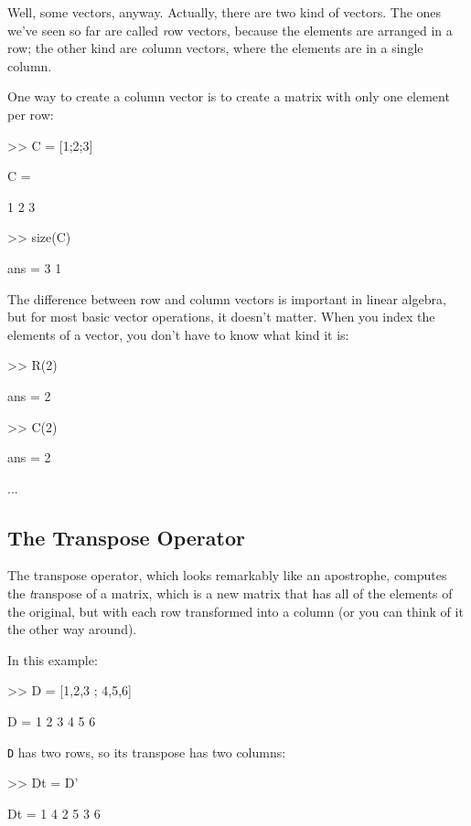 Well, some vectors, anyway.  Actually, there are two kind
of vectors.  The ones we've seen so far are called {\emph row vectors},
because the elements are arranged in a row; the other kind are
{\emph column vectors}, where the elements are in a single column.

One way to create a column vector is to create a matrix with only
one element per row:

\begin{code}
>> C = [1;2;3]

C =

     1
     2
     3

>> size(C)

ans = 3     1
\end{code}

The difference between row and column vectors is important in
linear algebra, but for most basic vector operations, it doesn't matter.  When you index the elements of a vector, you don't have to know what kind
it is:


\begin{code}
>> R(2)

ans = 2

>> C(2)

ans = 2
\end{code}

...

\subsection{The Transpose Operator}

The transpose operator, which looks remarkably like an apostrophe,
computes the {\emph transpose} of a matrix, which is a new matrix
that has all of the elements of the original, but with each row
transformed into a column (or you can think of it the other way around).


In this example:

\begin{code}
>> D = [1,2,3 ; 4,5,6]

D =  1     2     3
     4     5     6
\end{code}

{\tt D} has two rows, so its transpose has two columns:

\begin{code}
>> Dt = D'

Dt = 1     4
     2     5
     3     6
\end{code}

